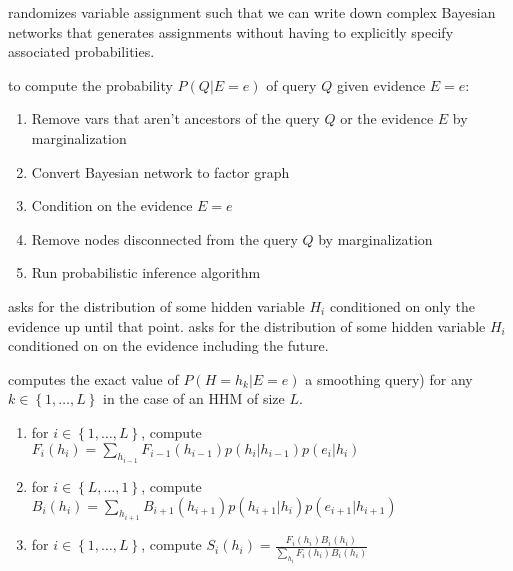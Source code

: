  randomizes variable assignment such that we can
write down complex Bayesian networks that generates assignments without having
to explicitly specify associated probabilities.

 to compute the probability $P(Q|E=e)$
of query $Q$ given evidence $E=e$:
\begin{enumerate}
    \item Remove vars that aren't ancestors of the query $Q$ or the evidence $E$ by marginalization
    \item Convert Bayesian network to factor graph
    \item Condition on the evidence $E=e$
    \item Remove nodes disconnected from the query $Q$ by marginalization
    \item Run probabilistic inference algorithm
\end{enumerate}
 asks for the distribution of some hidden variable
$H_i$ conditioned on only the evidence up until that point. 
 asks for the distribution of some hidden variable
$H_i$ conditioned on on the evidence including the future. 

 computes the exact value of $P(H=h_k|E=e)$ a
smoothing query) for any $k\in\left\{1,\dots,L\right\}$ in the case of an HHM of
size $L$.
\begin{enumerate}
    \item for $i\in \left\{1,\dots,L\right\}$, compute $F_i(h_i)=\sum_{h_{i-1}}F_{i-1}(h_{i-1})p(h_i|h_{i-1})p(e_i|h_i)$
    \item for $i\in \left\{L,\dots,1\right\}$, compute $B_i(h_i)=\sum_{h_{i+1}}B_{i+1}(h_{i+1})p(h_{i+1}|h_i)p(e_{i+1}|h_{i+1})$
    \item for $i\in \left\{1,\dots,L\right\}$, compute $S_i(h_i)=\frac{F_i(h_i)B_i(h_i)}{\sum_{h_i}F_i(h_i)B_i(h_i)}$
\end{enumerate}
